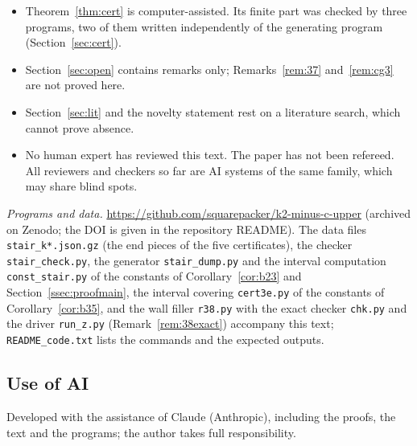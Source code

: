 \documentclass[11pt]{amsart}
\theoremstyle{definition}
\theoremstyle{remark}
\numberwithin{equation}{section}
\begin{document}
\begin{itemize}
their fixes are included (the hypothesis (E-iv) in the form $\varepsilon_m+\tau<1$, two table values, the decomposition
of the certified bound, and the reason for $b_0=10^{16}$). An independent reimplementation found no counterexample. The
author's own interval program for Corollary~\ref{cor:b35} used too little slack on the wall tilts; the constant
$C_E=15.54$ is certified by three independent full-range interval coverings ($C_E\le14.964$, $14.963$ and $14.9631$;
\texttt{mpmath.iv} twice and \texttt{python-flint} arb once). The asymptotic regime ($b\ge10^{16}$) cannot
be tested by explicit computation; the explicit checks cover the validity of the construction at smaller $b$
(Remark~\ref{rem:38exact}). It deserves priority in a human review.
\item Theorem~\ref{thm:cert} is computer-assisted. Its finite part was checked by three programs, two of them written
independently of the generating program (Section~\ref{sec:cert}).
\item Section~\ref{sec:open} contains remarks only; Remarks~\ref{rem:37} and~\ref{rem:cg3} are not proved here.
\item Section~\ref{sec:lit} and the novelty statement rest on a literature search, which cannot prove absence.
\item No human expert has reviewed this text. The paper has not been refereed. All reviewers and checkers so far are
AI systems of the same family, which may share blind spots.
\end{itemize}

\emph{Programs and data.} \url{https://github.com/squarepacker/k2-minus-c-upper} (archived on Zenodo; the DOI is
given in the repository README). The data files \texttt{stair\_k*.json.gz} (the end pieces of the five certificates),
the checker \texttt{stair\_check.py}, the generator \texttt{stair\_dump.py} and the interval computation
\texttt{const\_stair.py} of the constants of Corollary~\ref{cor:b23} and Section~\ref{ssec:proofmain}, the interval
covering \texttt{cert3e.py} of the constants of Corollary~\ref{cor:b35}, and the wall filler \texttt{r38.py} with the
exact checker \texttt{chk.py} and the driver \texttt{run\_z.py} (Remark~\ref{rem:38exact}) accompany this text;
\texttt{README\_code.txt} lists the commands and the expected outputs.

\subsection*{Use of AI}
Developed with the assistance of Claude (Anthropic), including the proofs, the text and the programs; the author takes
full responsibility.
\end{document}
